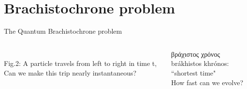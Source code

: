 \documentclass[10pt]{beamer}
\begin{document}
\section{Brachistochrone problem}
\begin{frame}{The Quantum Brachistochrone problem}
\vspace{0.5cm}
\begin{columns}
    \hspace{1.5em}
    \begin{column}{\textwidth}
    \\
    \hspace{1em}
    \tiny{Fig.2:
    A particle travels from left to right in time t,\\
    \hspace{2.4em}
    Can we make this trip nearly instantaneous?}
    \end{column}
    
    \hspace{-15em}
    \begin{column}{0.5\textwidth}

        βράχιστος χρόνος\\
        brákhistos khrónos:\\
        ``shortest time"\\
    \vspace{1cm}
    \pause
    \small{\textcolor{myNewColorC}{How fast can we evolve?}
    }
    \end{column}
    \end{columns}
\end{frame}
\end{document}
